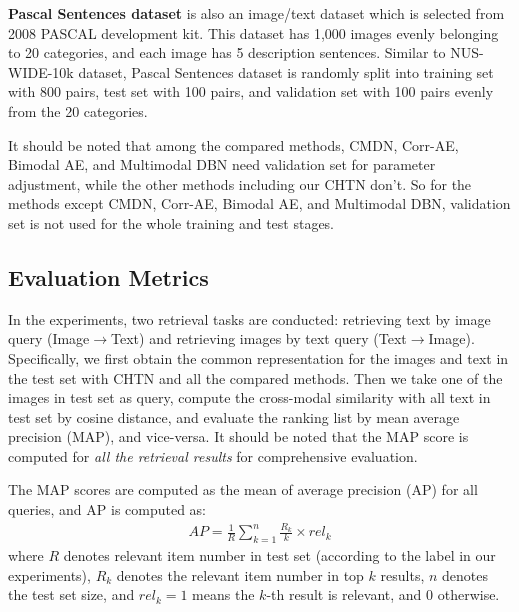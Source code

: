 \documentclass{article}
\begin{document}
{\textbf {Pascal Sentences dataset}} \cite{PascalSentence} is also an image/text dataset which is selected from 2008 PASCAL development kit. This dataset has 1,000 images evenly belonging to 20 categories, and each image has 5 description sentences. Similar to NUS-WIDE-10k dataset, Pascal Sentences dataset is randomly split into training set with 800 pairs, test set with 100 pairs, and validation set with 100 pairs evenly from the 20 categories.

It should be noted that among the compared methods, CMDN, Corr-AE, Bimodal AE, and Multimodal DBN need validation set for parameter adjustment, while the other methods including our CHTN don't. So for the methods except CMDN, Corr-AE, Bimodal AE, and Multimodal DBN, validation set is not used for the whole training and test stages.

\subsection{Evaluation Metrics}

In the experiments, two retrieval tasks are conducted: retrieving text by image query (Image$\rightarrow$Text) and retrieving images by text query (Text$\rightarrow$Image). Specifically, we first obtain the common representation for the images and text in the test set with CHTN and all the compared methods. Then we take one of the images in test set as query, compute the cross-modal similarity with all text in test set by cosine distance, and evaluate the ranking list by mean average precision (MAP), and vice-versa. It should be noted that the MAP score is computed for \emph{all the retrieval results} for comprehensive evaluation.

The MAP scores are computed as the mean of average precision (AP) for all queries, and AP is computed as:
\begin{align}
   AP = \frac 1 R \sum_{k=1}^n \frac {R_k} k \times rel_k
\end{align}
where $R$ denotes relevant item number in test set (according to the label in our experiments), $R_k$ denotes the relevant item number in top $k$ results, $n$ denotes the test set size, and $rel_k = 1$ means the $k$-th result is relevant, and 0 otherwise.


\end{document}
